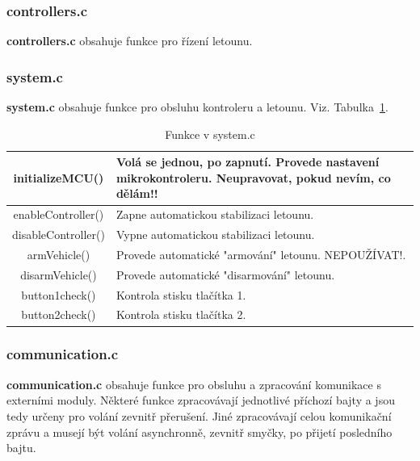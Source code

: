 \documentclass[11pt, a4paper]{article}
\begin{document}
\subsubsection{controllers.c}\label{cap:controllers}

\textbf{controllers.c} obsahuje funkce pro řízení letounu.

\subsubsection{system.c}

\textbf{system.c} obsahuje funkce pro obsluhu kontroleru a letounu. Viz. Tabulka~\ref{tab:system.c}.

\begin{table}
\begin{center}
\begin{tabular}{| c | p{8cm} |}
\hline
initializeMCU() & Volá se jednou, po zapnutí. Provede nastavení mikrokontroleru.
\newline \textbf{Neupravovat, pokud nevím, co dělám!!}\\
\hline
enableController() & Zapne automatickou stabilizaci letounu.\\
\hline
disableController() & Vypne automatickou stabilizaci letounu.\\
\hline
armVehicle() & Provede automatické "armování" letounu. NEPOUŽÍVAT!.\\
\hline
disarmVehicle() & Provede automatické "disarmování" letounu.\\
\hline
button1check() & Kontrola stisku tlačítka 1.\\
\hline
button2check() & Kontrola stisku tlačítka 2.\\
\hline
\end{tabular}
\caption{Funkce v system.c}
\label{tab:system.c}
\end{center}
\end{table}

\subsubsection{communication.c}

\textbf{communication.c} obsahuje funkce pro obsluhu a zpracování komunikace s externími moduly. Některé funkce zpracovávají jednotlivé příchozí bajty a jsou tedy určeny pro volání zevnitř přerušení. Jiné zpracovávají celou komunikační zprávu a musejí být volání asynchronně, zevnitř smyčky, po přijetí posledního bajtu.
\end{document}
